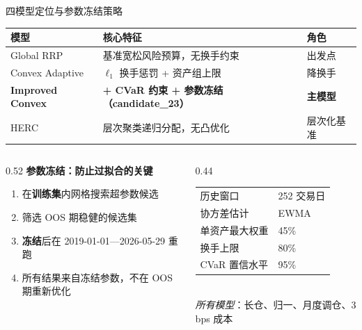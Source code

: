 \documentclass[aspectratio=169,11pt]{beamer}
\newcommand{\evalStartDate}{2019-01-01}
\newcommand{\evalEndDate}{2026-05-29}
\newcommand{\txCostBps}{3}
\begin{document}
\begin{frame}{四模型定位与参数冻结策略}
  \footnotesize\renewcommand{\arraystretch}{1.3}
  \begin{tabular}{@{}l>{\raggedright\arraybackslash}p{6.2cm}>{\raggedright\arraybackslash}p{2.8cm}@{}}
    \toprule
    模型 & 核心特征 & 角色 \\
    \midrule
    Global RRP       & 基准宽松风险预算，无换手约束         & 出发点 \\
    Convex Adaptive  & $\ell_1$ 换手惩罚 + 资产组上限       & 降换手 \\
    \textbf{Improved Convex} & \textbf{+ CVaR 约束 + 参数冻结（candidate\_23）} & \textbf{主模型} \\
    HERC             & 层次聚类递归分配，无凸优化            & 层次化基准 \\
    \bottomrule
  \end{tabular}
  \vspace{0.4em}
  \begin{columns}[T]
    \begin{column}{0.52\textwidth}
      \textbf{参数冻结：防止过拟合的关键}
      \begin{enumerate}
        \item 在\textbf{训练集}内网格搜索超参数候选
        \item 筛选 OOS 期稳健的候选集
        \item \textbf{冻结}后在 \evalStartDate{}—\evalEndDate{} 重跑
        \item 所有结果来自冻结参数，不在 OOS 期重新优化
      \end{enumerate}
    \end{column}
    \begin{column}{0.44\textwidth}
      \begin{tabular}{@{}ll@{}}
        历史窗口 & 252 交易日 \\
        协方差估计 & EWMA \\
        单资产最大权重 & 45\% \\
        换手上限 & 80\% \\
        CVaR 置信水平 & 95\% \\
      \end{tabular}
      \vspace{0.2em}\\
      \textit{所有模型}：长仓、归一、月度调仓、\txCostBps{} bps 成本
    \end{column}
  \end{columns}
\end{frame}
\end{document}
